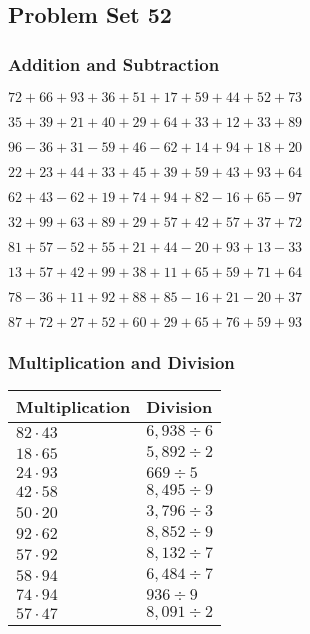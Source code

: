 \hypertarget{problem-set-52}{%
\subsection{Problem Set 52}\label{problem-set-52}}

\hypertarget{addition-and-subtraction}{%
\subsubsection{Addition and
Subtraction}\label{addition-and-subtraction}}

\(72+66+93+36+51+17+59+44+52+73\)

\(35+39+21+40+29+64+33+12+33+89\)

\(96-36+31-59+46-62+14+94+18+20\)

\(22+23+44+33+45+39+59+43+93+64\)

\(62+43-62+19+74+94+82-16+65-97\)

\(32+99+63+89+29+57+42+57+37+72\)

\(81+57-52+55+21+44-20+93+13-33\)

\(13+57+42+99+38+11+65+59+71+64\)

\(78-36+11+92+88+85-16+21-20+37\)

\(87+72+27+52+60+29+65+76+59+93\)

\hypertarget{multiplication-and-division}{%
\subsubsection{Multiplication and
Division}\label{multiplication-and-division}}

\begin{longtable}[]{@{}ll@{}}
\toprule
Multiplication & Division\tabularnewline
\midrule
\endhead
\(82\cdot43\) & \(6,938÷6\)\tabularnewline
\(18\cdot65\) & \(5,892÷2\)\tabularnewline
\(24\cdot93\) & \(669÷5\)\tabularnewline
\(42\cdot58\) & \(8,495÷9\)\tabularnewline
\(50\cdot20\) & \(3,796÷3\)\tabularnewline
\(92\cdot62\) & \(8,852÷9\)\tabularnewline
\(57\cdot92\) & \(8,132÷7\)\tabularnewline
\(58\cdot94\) & \(6,484÷7\)\tabularnewline
\(74\cdot94\) & \(936÷9\)\tabularnewline
\(57\cdot47\) & \(8,091÷2\)\tabularnewline
\bottomrule
\end{longtable}
